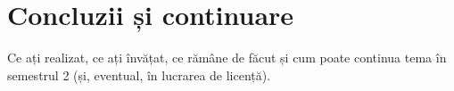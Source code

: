 \chapter{Concluzii și continuare}
Ce ați realizat, ce ați învățat, ce rămâne de făcut și cum poate continua tema în semestrul 2
(și, eventual, în lucrarea de licență).
